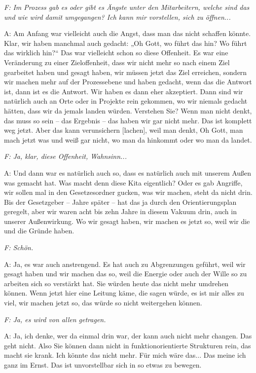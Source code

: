 \begin{linenumbers}
\emph{F: Im Prozess gab es oder gibt es Ängste unter den Mitarbeitern, welche sind das und wie wird damit umgegangen? Ich kann mir vorstellen, sich zu öffnen...}

A: Am Anfang war vielleicht auch die Angst, dass man das nicht schaffen könnte. Klar, wir haben manchmal auch gedacht: „Oh Gott, wo führt das hin? Wo führt das wirklich hin?“ Das war vielleicht schon so diese Offenheit. Es war eine Veränderung zu einer Zieloffenheit, dass wir nicht mehr so nach einem Ziel gearbeitet haben und gesagt haben, wir müssen jetzt das Ziel erreichen, sondern wir machen mehr auf der Prozessebene und haben gedacht, wenn das die Antwort ist, dann ist es die Antwort. Wir haben es dann eher akzeptiert. Dann sind wir natürlich auch an Orte oder in Projekte rein gekommen, wo wir niemals gedacht hätten, dass wir da jemals landen würden. Verstehen Sie? Wenn man nicht denkt, das muss so sein -- das Ergebnis -- das haben wir gar nicht mehr. Das ist komplett weg jetzt. Aber das kann verunsichern [lachen], weil man denkt, Oh Gott, man mach jetzt was und weiß gar nicht, wo man da hinkommt oder wo man da landet. 

\emph{F: Ja, klar, diese Offenheit, Wahnsinn...}

A: Und dann war es natürlich auch so, dass es natürlich auch mit unserem Außen was gemacht hat. Was macht denn diese Kita eigentlich? Oder es gab Angriffe, wir sollen mal in den Gesetzesordner gucken, was wir machen, steht da nicht drin. Bis der Gesetzgeber -- Jahre später -- hat das ja durch den Orientierungsplan geregelt, aber wir waren acht bis zehn Jahre in diesem Vakuum drin, auch in unserer Außenwirkung. Wo wir gesagt haben, wir machen es jetzt so, weil wir die und die Gründe haben.

\emph{F: Schön.}

A: Ja, es war auch anstrengend. Es hat auch zu Abgrenzungen geführt, weil wir gesagt haben und wir machen das so, weil die Energie oder auch der Wille so zu arbeiten sich so verstärkt hat. Sie würden heute das nicht mehr umdrehen können. Wenn jetzt hier eine Leitung käme, die sagen würde, es ist mir alles zu viel, wir machen jetzt so, das würde so nicht weitergehen können.

\emph{F: Ja, es wird von allen getragen.}

A: Ja, ich denke, wer da einmal drin war, der kann auch nicht mehr changen. Das geht nicht. Also Sie können dann nicht in funktionorientierte Strukturen rein, das macht sie krank. Ich könnte das nicht mehr. Für mich wäre das... Das meine ich ganz im Ernst. Das ist unvorstellbar sich in so etwas zu bewegen. 


\end{linenumbers}
